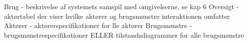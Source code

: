 Brug - beskrivelse af systemets samspil med omgivelserne, se kap 6
	Oversigt - aktørtabel der viser hvilke aktører og brugsmønstre interaktionen omfatter
	Aktører - aktørerspecifikationer for lle aktører
	Brugsmønstre - brugsmønstrespecifikationer ELLER tilstandsdiagrammer for alle brugsmønstre